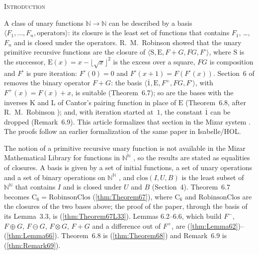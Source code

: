 \documentclass[10pt]{article}
\newcommand{\fmkeep}{\par\vskip 0pt plus 8\baselineskip\penalty-200
  \vskip 0pt plus -8\baselineskip}
\newcommand{\fmunnumbered}[1]{%
  \fmkeep\bigskip\begin{center}\normalsize\scshape #1\end{center}\nopagebreak\smallskip}
\newcommand{\thref}[1]{(\ref{thm:#1})}
\begin{document}
\fmunnumbered{Introduction}

A class of unary functions $\mathbb{N} \to \mathbb{N}$ can be described by a
basis $\langle F_1, \ldots, F_n, \text{operators}\rangle$: its closure is the
least set of functions that contains $F_1$, \ldots, $F_n$ and is closed under
the operators. R.~M.~Robinson \cite{rrobinson1947} showed that the unary
primitive recursive functions are the closure of
$\langle \mathrm{S}, \mathrm{E}, F + G, FG, F^{\square}\rangle$, where
$\mathrm{S}$ is the successor, $\mathrm{E}(x) = x - \lfloor\sqrt{x}\rfloor^2$
is the excess over a square, $FG$ is composition and $F^{\square}$ is pure
iteration: $F^{\square}(0) = 0$ and $F^{\square}(x + 1) = F(F^{\square}(x))$.
Section~6 of \cite{severin} removes the binary operator $F + G$: the basis
$\langle \overline{1}, \mathrm{E}, F^{+}, FG, F^{\square}\rangle$, with
$F^{+}(x) = F(x) + x$, is suitable (Theorem~6.7); so are the bases with the
inverses $\mathrm{K}$ and $\mathrm{L}$ of Cantor's pairing function in place of
$\mathrm{E}$ (Theorem~6.8, after R.~M.~Robinson \cite{rrobinson1955}); and,
with iteration started at~$1$, the constant $\overline{1}$ can be dropped
(Remark~6.9). This article formalizes that section in the Mizar system
\cite{mizar,fourdecades}. The proofs follow an earlier formalization of the
same paper in Isabelle/HOL.

The notion of a primitive recursive unary function is not available in the
Mizar Mathematical Library for functions in $\mathbb{N}^{\mathbb{N}}$
\cite{funct2}, so the results are stated as equalities of closures. A basis is
given by a set of initial functions, a set of unary operations and a set of
binary operations on $\mathbb{N}^{\mathbb{N}}$ \cite{binop1}, and
$\mathrm{clos}(I, U, B)$ is the least subset of $\mathbb{N}^{\mathbb{N}}$
that contains $I$ and is closed under $U$ and $B$ (Section~4). Theorem~6.7
becomes $\mathrm{C}_6 = \mathrm{RobinsonClos}$ \thref{Theorem67}, where
$\mathrm{C}_6$ and $\mathrm{RobinsonClos}$ are the closures of the two bases
above; the proof of the paper, through the basis of its Lemma~3.3, is
\thref{Theorem67L33}. Lemmas 6.2--6.6, which build $F^{-}$, $F \oplus G$,
$F \ominus G$, $F \otimes G$, $F + G$ and a difference out of $F^{+}$, are
\thref{Lemma62}--\thref{Lemma66}. Theorem~6.8 is \thref{Theorem68} and
Remark~6.9 is \thref{Remark69}.
\end{document}
